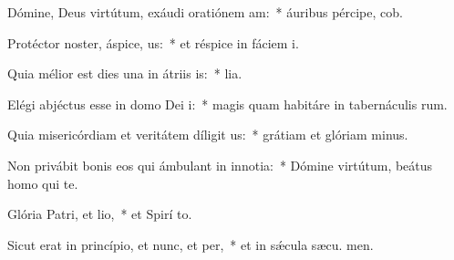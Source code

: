 \item Dómine, Deus virtútum, exáudi oratiónem am:~* áuribus pércipe,  cob.
\item Protéctor noster, áspice, us:~* et réspice in fáciem  i.
\item Quia mélior est dies una in átriis is:~*  lia.
\item Elégi abjéctus esse in domo Dei i:~* magis quam habitáre in tabernáculis rum.
\item Quia misericórdiam et veritátem díligit us:~* grátiam et glóriam  minus.
\item Non privábit bonis eos qui ámbulant in innotia:~* Dómine virtútum, beátus homo qui   te.
\item Glória Patri, et lio,~* et Spirí to.
\item Sicut erat in princípio, et nunc, et per,~* et in sǽcula sæcu. men.
